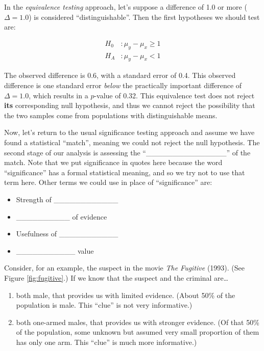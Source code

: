 \documentclass[]{book}
\providecommand{\tightlist}{%
  \setlength{\itemsep}{0pt}\setlength{\parskip}{0pt}}
\theoremstyle{definition}
\theoremstyle{definition}
\theoremstyle{remark}
\begin{document}
In the \emph{equivalence testing} approach, let's suppose a difference
of 1.0 or more (\(\Delta = 1.0\)) is considered ``distinguishable''.
Then the first hypotheses we should test are:

\begin{equation}\label{eq:eth1}
\begin{split}
H_0 & : \mu_y - \mu_x \geq 1 \\
H_A & : \mu_y - \mu_x < 1 
\end{split}
\end{equation}

The observed difference is 0.6, with a standard error of 0.4. This
observed difference is one standard error \emph{below} the practically
important difference of \(\Delta = 1.0\), which results in a \(p\)-value
of 0.32. This equivalence test does not reject \textbf{its}
corresponding null hypothesis, and thus we cannot reject the possibility
that the two samples come from populations with distinguishable means.

Now, let's return to the usual significance testing approach and assume
we have found a statistical ``match'', meaning we could not reject the
null hypothesis. The second stage of our analysis is assessing the
``\_\_\_\_\_\_\_\_\_\_\_\_\_\_\_'' of the match. Note that we put
significance in quotes here because the word ``significance'' has a
formal statistical meaning, and so we try not to use that term here.
Other terms we could use in place of ``significance'' are:

\begin{itemize}
\tightlist
\item
  Strength of \_\_\_\_\_\_\_\_\_\_\_\_ \vspace{.1in}
\item
  \_\_\_\_\_\_\_\_\_\_ of evidence \vspace{.1in}
\item
  Usefulness of \_\_\_\_\_\_\_\_\_\_\_ \vspace{.1in}
\item
  \_\_\_\_\_\_\_\_\_\_\_ value
\end{itemize}

Consider, for an example, the suspect in the movie \emph{The Fugitive}
(1993). (See Figure \ref{fig:fugitive}.) If we know that the suspect and
the criminal are\ldots{}

\begin{enumerate}
\def\labelenumi{\arabic{enumi}.}
\tightlist
\item
  both male, that provides us with limited evidence. (About 50\% of the
  population is male. This ``clue'' is not very informative.)
\item
  both one-armed males, that provides us with stronger evidence. (Of
  that 50\% of the population, some unknown but assumed very small
  proportion of them has only one arm. This ``clue'' is much more
  informative.)
\end{enumerate}
\end{document}
